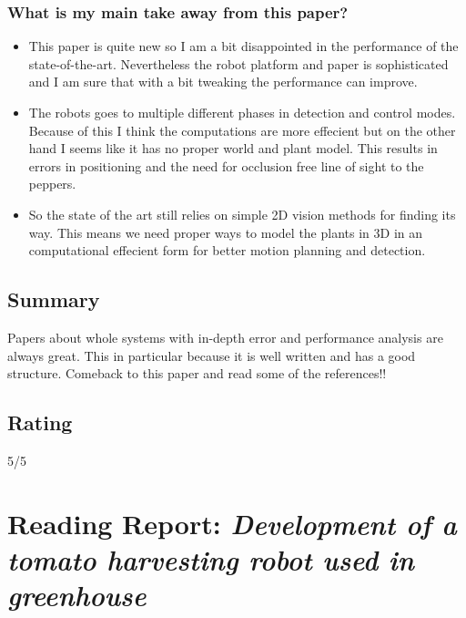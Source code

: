 \subsubsection*{What is my main take away from this paper?}
\begin{itemize}
    \item This paper is quite new so I am a bit disappointed in the performance of the state-of-the-art.
    Nevertheless the robot platform and paper is sophisticated and I am sure that with a bit tweaking the performance can improve.
    \item The robots goes to multiple different phases in detection and control modes. Because of this I think the 
    computations are more effecient but on the other hand I seems like it has no proper world and plant model. 
    This results in errors in positioning and the need for occlusion free line of sight to the peppers. 
    \item So the state of the art still relies on simple 2D vision methods for finding its way.  
    This means we need proper ways to model the plants in 3D in an computational effecient form for better motion planning and detection.
\end{itemize}

\subsection*{Summary}
Papers about whole systems with in-depth error and performance analysis are always great. This in particular because it is well written and has a good structure. 
Comeback to this paper and read some of the references!!

\subsection*{Rating}
5/5


\section{Reading Report: \emph{Development of a tomato harvesting robot used in greenhouse}}
\cite{Lili2017}

